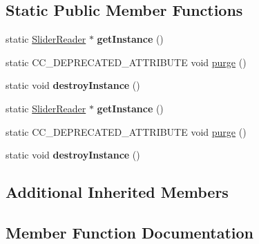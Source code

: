 \subsection*{Static Public Member Functions}
\begin{DoxyCompactItemize}
\item 
\mbox{\label{classcocostudio_1_1SliderReader_a2b6c86a380ba96951089296e116f9c57}} 
static \hyperlink{classcocostudio_1_1SliderReader}{Slider\+Reader} $\ast$ {\bfseries get\+Instance} ()
\item 
static C\+C\+\_\+\+D\+E\+P\+R\+E\+C\+A\+T\+E\+D\+\_\+\+A\+T\+T\+R\+I\+B\+U\+TE void \hyperlink{classcocostudio_1_1SliderReader_a7db674d5977ceae94f2fa14195d06545}{purge} ()
\item 
\mbox{\label{classcocostudio_1_1SliderReader_ac309eefb0ed1b25eb00064e77e484617}} 
static void {\bfseries destroy\+Instance} ()
\item 
\mbox{\label{classcocostudio_1_1SliderReader_af2171fc41d0751e299d155c026a3ea7d}} 
static \hyperlink{classcocostudio_1_1SliderReader}{Slider\+Reader} $\ast$ {\bfseries get\+Instance} ()
\item 
static C\+C\+\_\+\+D\+E\+P\+R\+E\+C\+A\+T\+E\+D\+\_\+\+A\+T\+T\+R\+I\+B\+U\+TE void \hyperlink{classcocostudio_1_1SliderReader_a7db674d5977ceae94f2fa14195d06545}{purge} ()
\item 
\mbox{\label{classcocostudio_1_1SliderReader_aca25b2b0092dac4e832027310d582e38}} 
static void {\bfseries destroy\+Instance} ()
\end{DoxyCompactItemize}
\subsection*{Additional Inherited Members}


\subsection{Member Function Documentation}
\mbox{\label{classcocostudio_1_1SliderReader_a7db674d5977ceae94f2fa14195d06545}} 
